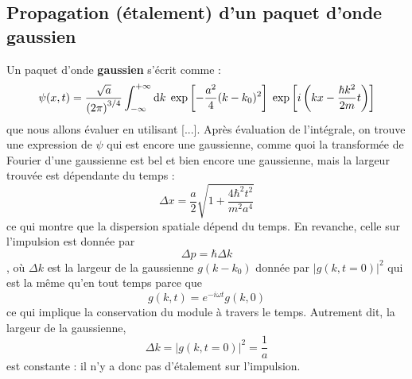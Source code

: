 \documentclass[12pt, a4paper]{book}
\begin{document}
\subsection{Propagation (étalement) d'un paquet d'onde gaussien}
Un paquet d'onde \textbf{gaussien} s'écrit comme :
\begin{equation}
\psi(x, t) = \dfrac{\sqrt{a}}{\left(2\pi\right) ^{3/4}} \int_{-\infty} ^{+\infty} \mathrm{d} k \; \exp \left[-\dfrac{a^2}{4} (k-k_0)^2\right] \; \exp\left[i \left(kx - \dfrac{\hbar k^2}{2m}t\right)\right]
\end{equation}
que nous allons évaluer en utilisant [...]. Après évaluation de l'intégrale, on trouve une expression de $\psi$ qui est encore une gaussienne, comme quoi la transformée de Fourier d'une gaussienne est bel et bien encore une gaussienne, mais la largeur trouvée est dépendante du temps :
\begin{equation}
\Delta x = \dfrac{a}{2} \sqrt{ 1 + \dfrac{4 \hbar ^2 t^2}{m^2 a^4}}
\end{equation}
ce qui montre que la dispersion spatiale dépend du temps. En revanche, celle sur l'impulsion est donnée par $$\Delta p = \hbar \Delta k$$, où $\Delta k$ est la largeur de la gaussienne $g(k-k_0)$ donnée par $|g(k,t=0)|^2$ qui est la même qu'en tout temps parce que $$g(k,t) = e^{-i\omega t} g(k,0)$$ ce qui implique la conservation du module à travers le temps. Autrement dit, la largeur de la gaussienne, 
$$\Delta k = |g(k,t=0)|^2 = \dfrac{1}{a}$$
est constante : il n'y a donc pas d'étalement sur l'impulsion.
\end{document}
